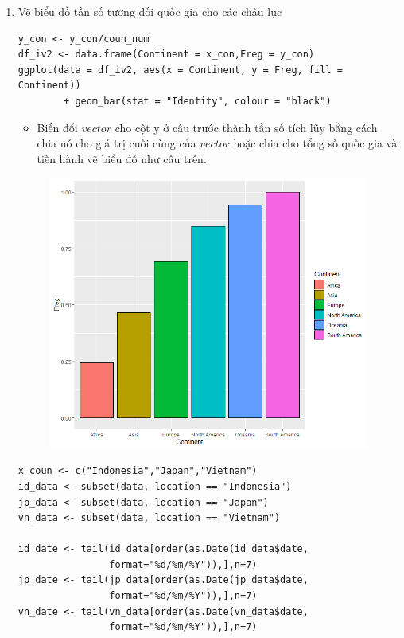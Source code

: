 \documentclass[a4paper]{article}
\theoremstyle{definition}
\begin{document}
\begin{enumerate}[i)]
\begin{enumerate}[1)]
    \item Vẽ biểu đồ tần số tương đối quốc gia cho các châu lục
    \lstset{
    title=Source code}
\begin{lstlisting}[frame=single]  
y_con <- y_con/coun_num
df_iv2 <- data.frame(Continent = x_con,Freg = y_con)
ggplot(data = df_iv2, aes(x = Continent, y = Freg, fill = Continent)) 
        + geom_bar(stat = "Identity", colour = "black")
\end{lstlisting}
\begin{itemize}
    \item Biến đổi $vector$ cho cột y ở câu trước thành tần số tích lũy bằng cách chia nó cho giá trị cuối cùng của $vector$ hoặc chia cho tổng số quốc gia và tiến hành vẽ biểu đồ như câu trên.
\end{itemize}
\begin{figure}[h!]
	\begin{center}
	    \includegraphics[scale=0.8]{Images/IV/iv (2).png}
	\end{center}
\end{figure}
    \newpage
    \lstset{
    title=Prep for iv3-4}
\begin{lstlisting}[frame=single]  
x_coun <- c("Indonesia","Japan","Vietnam")
id_data <- subset(data, location == "Indonesia")
jp_data <- subset(data, location == "Japan")
vn_data <- subset(data, location == "Vietnam")

id_date <- tail(id_data[order(as.Date(id_data$date,
                format="%d/%m/%Y")),],n=7)
jp_date <- tail(jp_data[order(as.Date(jp_data$date,
                format="%d/%m/%Y")),],n=7)
vn_date <- tail(vn_data[order(as.Date(vn_data$date,
                format="%d/%m/%Y")),],n=7)


\end{lstlisting}
\end{enumerate}
\end{enumerate}
\end{document}
